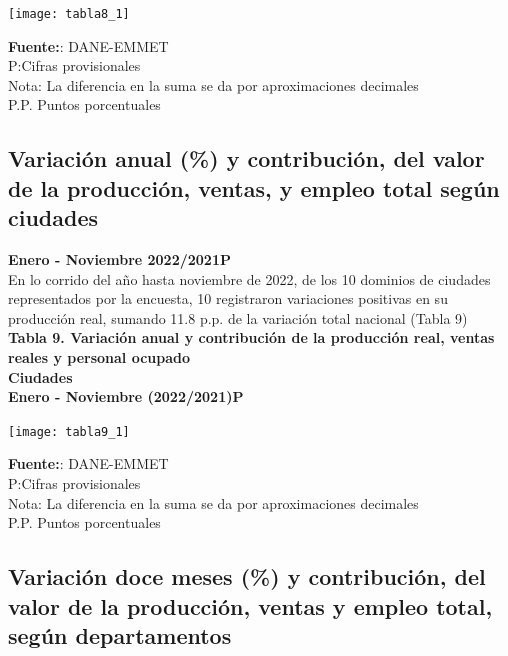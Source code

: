 \documentclass[
]{article}
\begin{document}
\begin{center}\texttt{[image: tabla8\_1]} \end{center}

\textbf{Fuente:}: DANE-EMMET\\
P:Cifras provisionales\\
Nota: La diferencia en la suma se da por aproximaciones decimales\\
P.P. Puntos porcentuales\\

\newpage

\hypertarget{variaciuxf3n-anual-y-contribuciuxf3n-del-valor-de-la-producciuxf3n-ventas-y-empleo-total-seguxfan-ciudades-1}{%
\subsection{Variación anual (\%) y contribución, del valor de la
producción, ventas, y empleo total según
ciudades}\label{variaciuxf3n-anual-y-contribuciuxf3n-del-valor-de-la-producciuxf3n-ventas-y-empleo-total-seguxfan-ciudades-1}}

\textbf{Enero - Noviembre 2022/2021P}\\

En lo corrido del año hasta noviembre de 2022, de los 10 dominios de
ciudades representados por la encuesta, 10 registraron variaciones
positivas en su producción real, sumando 11.8 p.p. de la variación total
nacional (Tabla 9)\\

\textbf{Tabla 9. Variación anual y contribución de la producción real,
ventas reales y personal ocupado}\\
\textbf{Ciudades}\\
\textbf{Enero - Noviembre (2022/2021)P}\\

\begin{center}\texttt{[image: tabla9\_1]} \end{center}

\textbf{Fuente:}: DANE-EMMET\\
P:Cifras provisionales\\
Nota: La diferencia en la suma se da por aproximaciones decimales\\
P.P. Puntos porcentuales\\

\hypertarget{variaciuxf3n-doce-meses-y-contribuciuxf3n-del-valor-de-la-producciuxf3n-ventas-y-empleo-total-seguxfan-departamentos}{%
\subsection{Variación doce meses (\%) y contribución, del valor de la
producción, ventas y empleo total, según
departamentos}\label{variaciuxf3n-doce-meses-y-contribuciuxf3n-del-valor-de-la-producciuxf3n-ventas-y-empleo-total-seguxfan-departamentos}}
\end{document}
